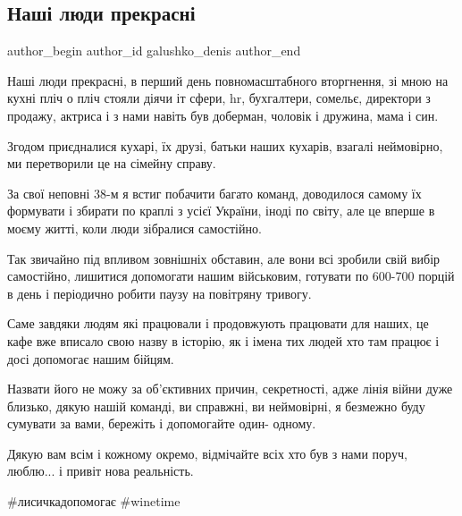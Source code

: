  
 
 
 
 

\subsection{Наші люди прекрасні}
\label{sec:20_03_2022.fb.galushko_denis.1.nash__lyudi_prekrasn}

\ifcmt
 author_begin
   author_id galushko_denis
 author_end
\fi

Наші люди прекрасні, в перший день повномасштабного вторгнення,  зі мною на
кухні пліч о пліч стояли діячи іт сфери, hr, бухгалтери, сомельє, директори з
продажу, актриса і з нами навіть був доберман, чоловік і дружина, мама і син.

Згодом приєдналися кухарі, їх друзі, батьки наших кухарів, взагалі неймовірно,
ми перетворили це на сімейну справу.

За свої неповні 38-м я встиг побачити багато команд, доводилося самому їх
формувати і збирати по краплі з усієї України, іноді по світу, але це вперше
в моєму житті, коли люди зібралися самостійно.

Так звичайно під впливом зовнішніх обставин, але вони всі зробили свій вибір
самостійно, лишитися  допомогати нашим військовим, готувати по 600-700
порцій в день і періодично робити паузу на повітряну тривогу. 

Саме завдяки людям які працювали і продовжують працювати для наших, це кафе
вже вписало свою назву в історію, як і імена тих людей хто там працює і досі
допомогає нашим бійцям.

Назвати його не можу за об'єктивних причин, секретності, адже лінія війни дуже
близько, дякую нашій команді, ви справжні, ви неймовірні, я безмежно буду
сумувати за вами, бережіть і допомогайте один- одному.

Дякую вам всім і кожному окремо, відмічайте всіх хто був з нами поруч, люблю...
і привіт нова реальність.

\#лисичкадопомогає \#winetime
